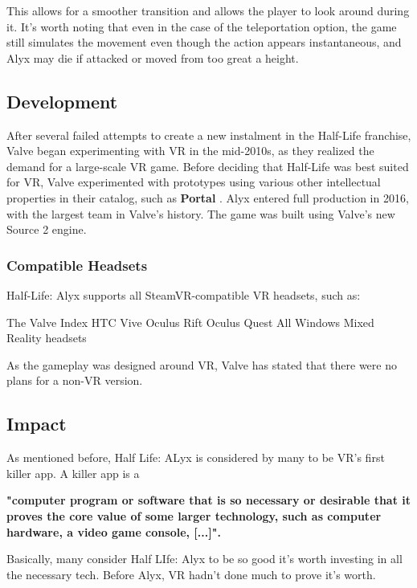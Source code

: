 \documentclass[a4paper,10pt]{book}
\begin{document}
 
         This allows for a smoother transition and allows the player to look around during it.
         It's worth noting that even in the case of the teleportation option, the game still simulates the movement even though the action appears instantaneous,
         and Alyx may die if attacked or moved from too great a height.
        
 \subsection{Development }
 
         After several failed attempts to create a new instalment in the Half-Life franchise, Valve began experimenting with VR in the mid-2010s, as they realized the demand for a large-scale VR game.
         Before deciding that Half-Life was best suited for VR, Valve experimented with prototypes using various other intellectual properties in their catalog, such as  \textbf{Portal } .
         Alyx entered full production in 2016, with the largest team in Valve's history. The game was built using Valve's new Source 2 engine.
        
 \subsubsection{Compatible Headsets }
 
         Half-Life: Alyx supports all SteamVR-compatible VR headsets, such as:
        
 
 The Valve Index 
 HTC Vive 
 Oculus Rift 
 Oculus Quest 
 All Windows Mixed Reality headsets 
 
 
          As the gameplay was designed around VR, Valve has stated that there were no plans for a non-VR version.
         
 \subsection{Impact }
 As mentioned before, Half Life: ALyx is considered by many to be VR's first killer app.
         A killer app is a
        
 
 \textbf{
           "computer program or software that is so necessary or desirable that it proves the core value of some larger technology, such as computer hardware, a video game console, [...]".
          } 
 
 
         Basically, many consider Half LIfe: Alyx to be so good it's worth investing in all the necessary tech.
         Before Alyx, VR hadn't done much to prove it's worth.
          
\end{document}
